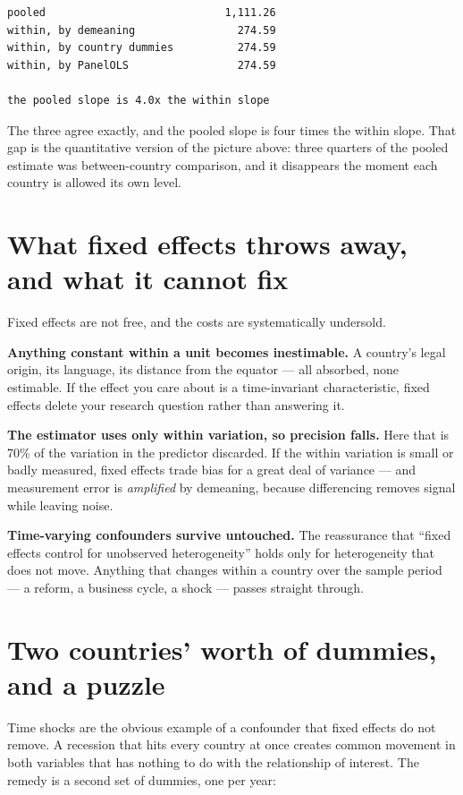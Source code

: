 \documentclass[
  letterpaper,
  10pt,
  twoside,
  openright,
  numbers=noenddot,
  chapterprefix=true]{scrbook}
\begin{document}
\begin{verbatim}
pooled                            1,111.26
within, by demeaning                274.59
within, by country dummies          274.59
within, by PanelOLS                 274.59

the pooled slope is 4.0x the within slope
\end{verbatim}

The three agree exactly, and the pooled slope is four times the within
slope. That gap is the quantitative version of the picture above: three
quarters of the pooled estimate was between-country comparison, and it
disappears the moment each country is allowed its own level.

\section{What fixed effects throws away, and what it cannot
fix}\label{what-fixed-effects-throws-away-and-what-it-cannot-fix}

Fixed effects are not free, and the costs are systematically undersold.

\textbf{Anything constant within a unit becomes inestimable.} A
country's legal origin, its language, its distance from the equator ---
all absorbed, none estimable. If the effect you care about is a
time-invariant characteristic, fixed effects delete your research
question rather than answering it.

\textbf{The estimator uses only within variation, so precision falls.}
Here that is 70\% of the variation in the predictor discarded. If the
within variation is small or badly measured, fixed effects trade bias
for a great deal of variance --- and measurement error is
\emph{amplified} by demeaning, because differencing removes signal while
leaving noise.

\textbf{Time-varying confounders survive untouched.} The reassurance
that ``fixed effects control for unobserved heterogeneity'' holds only
for heterogeneity that does not move. Anything that changes within a
country over the sample period --- a reform, a business cycle, a shock
--- passes straight through.

\section{Two countries' worth of dummies, and a
puzzle}\label{two-countries-worth-of-dummies-and-a-puzzle}

Time shocks are the obvious example of a confounder that fixed effects
do not remove. A recession that hits every country at once creates
common movement in both variables that has nothing to do with the
relationship of interest. The remedy is a second set of dummies, one per
year:
\end{document}
